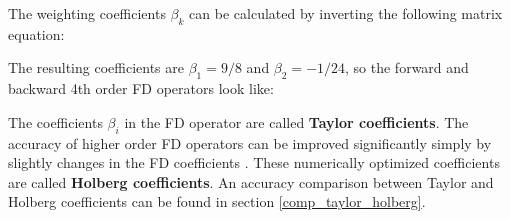 \documentclass[11pt,onecolumn,oneside]{article}
\begin{document}

The weighting coefficients $\beta_k$ can be calculated by inverting the following matrix equation:


The resulting coefficients are $\beta_1=9/8$ and $\beta_2=-1/24$, so the forward and backward 4th order FD operators look like:


The coefficients $\beta_i$ in the FD operator are called {\bf{Taylor coefficients}}. The accuracy of higher order FD operators can be improved significantly simply by slightly changes in the FD coefficients \cite{holberg:87}. These numerically optimized coefficients are called {\bf{Holberg coefficients}}. An accuracy comparison between Taylor and Holberg coefficients can be found in section \ref{comp_taylor_holberg}.
\end{document}
